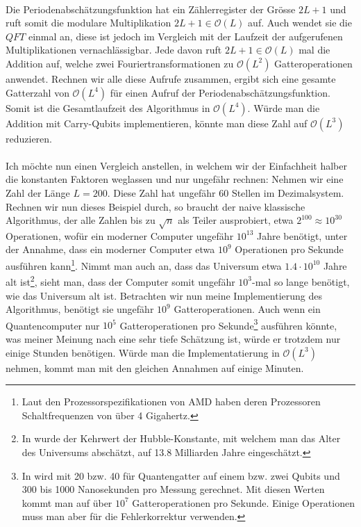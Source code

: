 \paragraph{}
Die Periodenabschätzungsfunktion hat ein Zählerregister der Grösse $2L + 1$ und ruft somit die modulare Multiplikation $2L + 1 \in \mathcal O(L)$ auf. Auch wendet sie die $QFT$ einmal an, diese ist jedoch im Vergleich mit der Laufzeit der aufgerufenen Multiplikationen vernachlässigbar. Jede davon ruft $2L + 1 \in \mathcal O(L)$ mal die Addition auf, welche zwei Fouriertransformationen zu $\mathcal O(L^2)$ Gatteroperationen anwendet. Rechnen wir alle diese Aufrufe zusammen, ergibt sich eine gesamte Gatterzahl von $\mathcal O(L^4)$ für einen Aufruf der Periodenabschätzungsfunktion. Somit ist die Gesamtlaufzeit des Algorithmus in $\mathcal O(L^4)$. Würde man die Addition mit Carry-Qubits implementieren, könnte man diese Zahl auf $\mathcal O(L^3)$ reduzieren.

\paragraph{}

Ich möchte nun einen Vergleich anstellen, in welchem wir der Einfachheit halber die konstanten Faktoren weglassen und nur ungefähr rechnen: Nehmen wir eine Zahl der Länge $L = 200$. Diese Zahl hat ungefähr $60$ Stellen im Dezimalsystem. Rechnen wir nun dieses Beispiel durch, so braucht der naive klassische Algorithmus, der alle Zahlen bis zu $\sqrt{n}$ als Teiler ausprobiert, etwa $2^{100} \approx 10^{30}$ Operationen, wofür ein moderner Computer ungefähr $10^{13}$ Jahre benötigt, unter der Annahme, dass ein moderner Computer etwa $10^9$ Operationen pro Sekunde ausführen kann\footnote{Laut den Prozessorspezifikationen von AMD \cite{amdpr} haben deren Prozessoren Schaltfrequenzen von über 4 Gigahertz.}. Nimmt man auch an, dass das Universum etwa $1.4 \cdot 10^{10}$ Jahre alt ist\footnote{In \cite{ageu} wurde der Kehrwert der Hubble-Konstante, mit welchem man das Alter des Universums abschätzt, auf 13.8 Milliarden Jahre eingeschätzt.}, sieht man, dass der Computer somit ungefähr $10^3$-mal so lange benötigt, wie das Universum alt ist. Betrachten wir nun meine Implementierung des Algorithmus, benötigt sie ungefähr $10^9$ Gatteroperationen. Auch wenn ein Quantencomputer nur $10^5$ Gatteroperationen pro Sekunde\footnote{In \cite{eqasm} wird mit 20 bzw. 40 für Quantengatter auf einem bzw. zwei Qubits und 300 bis 1000 Nanosekunden pro Messung gerechnet. Mit diesen Werten kommt man auf über $10^7$ Gatteroperationen pro Sekunde. Einige Operationen muss man aber für die Fehlerkorrektur verwenden.} ausführen könnte, was meiner Meinung nach eine sehr tiefe Schätzung ist, würde er trotzdem nur einige Stunden benötigen. Würde man die Implementatierung in $\mathcal O(L^3)$ nehmen, kommt man mit den gleichen Annahmen auf einige Minuten.